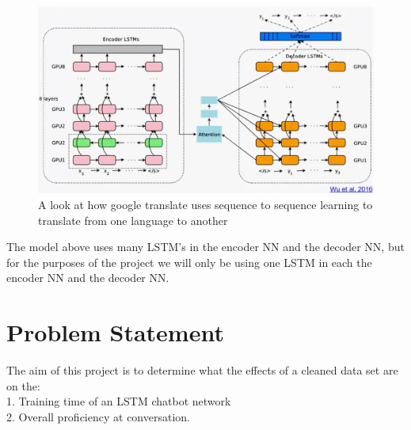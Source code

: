 \documentclass[titlepage]{article}
\newcommand\tab[1][1cm]{\hspace*{#1}}
\begin{document}
\begin{figure}[H]
	\centering
	\includegraphics[width=120mm]{Seq2seq.jpg}
	\caption{A look at how google translate uses sequence to sequence learning to translate from one language to another}
	\label{fig:seq2seqgoogletranslate}
\end{figure}
The model above uses many LSTM's in the encoder NN and the decoder NN, but for the purposes of the project we will only be using one LSTM in each the encoder NN and the decoder NN.


\section{Problem Statement}
The aim of this project is to determine what the effects of a cleaned data set are on the:\\
\tab 1. Training time of an LSTM chatbot network\\
\tab 2. Overall proficiency at conversation.
\end{document}
